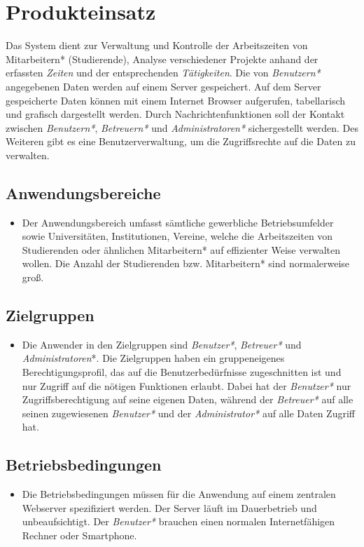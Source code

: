 \section{Produkteinsatz}
Das System dient zur Verwaltung und Kontrolle der Arbeitszeiten von Mitarbeitern* (Studierende), Analyse verschiedener Projekte anhand der erfassten \emph{Zeiten} und der entsprechenden \emph{Tätigkeiten}.
Die von \emph{Benutzern*} angegebenen Daten werden auf einem Server gespeichert. Auf dem Server gespeicherte Daten können mit einem Internet Browser aufgerufen, tabellarisch und grafisch dargestellt werden.
Durch Nachrichtenfunktionen soll der Kontakt zwischen \emph{Benutzern*}, \emph{Betreuern*} und \emph{Administratoren*} sichergestellt werden.
Des Weiteren gibt es eine Benutzerverwaltung, um die Zugriffsrechte auf die Daten zu verwalten.
\subsection{Anwendungsbereiche}
\begin{itemize}
	\item Der Anwendungsbereich umfasst sämtliche gewerbliche Betriebsumfelder sowie Universitäten, Institutionen, Vereine,
	welche die Arbeitszeiten von Studierenden oder ähnlichen Mitarbeitern* auf effizienter Weise verwalten wollen. Die Anzahl der Studierenden bzw. Mitarbeitern* sind normalerweise groß.
\end{itemize}

\subsection{Zielgruppen}
\begin{itemize}
	\item Die Anwender in den Zielgruppen sind \emph{Benutzer*}, \emph{Betreuer*} und \emph{Administratoren}*.
	Die Zielgruppen haben ein gruppeneigenes Berechtigungsprofil, das auf die Benutzerbedürfnisse zugeschnitten ist und nur Zugriff auf die nötigen Funktionen erlaubt.
	Dabei hat der \emph{Benutzer*} nur Zugriffsberechtigung auf seine eigenen Daten, während der \emph{Betreuer*} auf alle seinen zugewiesenen \emph{Benutzer*} und der \emph{Administrator*} auf alle Daten Zugriff hat.
\end{itemize}

\subsection{Betriebsbedingungen}
\begin{itemize}
	\item Die Betriebsbedingungen müssen für die Anwendung auf einem zentralen Webserver spezifiziert werden. Der Server läuft im Dauerbetrieb und unbeaufsichtigt.
	Der \emph{Benutzer*} brauchen einen normalen Internetfähigen Rechner oder Smartphone.
\end{itemize}
